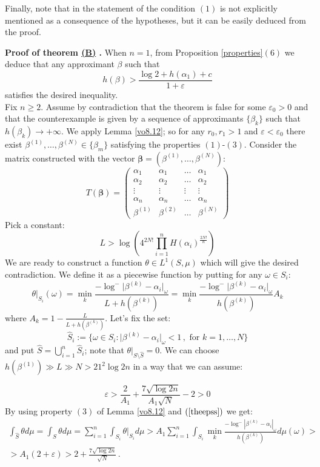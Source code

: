 \documentclass[10 pt,a4paper]{article}
\theoremstyle{plain}
\theoremstyle{definition}
\theoremstyle{named}
\newcommand\bref[3][blue]{%
    \begingroup%
    \hypersetup{linkcolor=#1}%
    \hyperlink{#2}{#3}%
    \endgroup}
\begin{document}
Finally,  note that in the statement of \cite[Proposition 8.12]{vo} the condition $(1)$ is not explicitly mentioned as a consequence of the hypotheses, but it can be easily deduced from the proof.
\endproof




\textbf{Proof of theorem \bref{thm:main}{(B)}.}
When $n=1$, from  Proposition \ref{properties}$(6)$ we deduce that  any approximant $\beta$ such that 
$$h(\beta)>\frac{\log 2+h(\alpha_1)+c}{1+\varepsilon}
$$
satisfies the desired inequality.\\
 

 Fix $n\ge 2$. Assume by contradiction that the theorem is false for some  $\varepsilon_0>0$ and that the counterexample is given by a sequence of approximants $\{\beta_k\}$ such that $h(\beta_k)\to+\infty$.  We apply Lemma \ref{vo8.12}; so for any  $r_0,r_1>1$ and $\varepsilon<\varepsilon_0$  there exist $\beta^{(1)},\ldots,\beta^{(N)}\in\{\beta_m\}$ satisfying the properties $(1)$-$(3)$. Consider the matrix constructed with the vector $\bm{\beta}=(\beta^{(1)},\ldots,\beta^{(N)})$:
\[
T(\bm{\beta})=\begin{pmatrix}
 \alpha_1& \alpha_1  &\ldots &\alpha_1 \\
 \alpha_2& \alpha_2  &\ldots &\alpha_2\\
\vdots & \vdots  & \vdots & \vdots\\
\alpha_n& \alpha_n  &\ldots &\alpha_n\\
\beta^{(1)}& \beta^{(2)}  &\ldots &\beta^{(N)}
\end{pmatrix}
\] 
 Pick a constant:
\[
L>  \log\left(4^{2N!}\prod^n_{i=1}H(\alpha_i)^{\frac{2N!}{n}}\right) 
\]
 We are ready to construct a function  $\theta\in L^1(S,\mu)$ which will give the desired contradiction. We define it as a piecewise function by putting for any $\omega\in S_i$:
\[
\theta|_{S_i}(\omega)=\min_k\frac{-\log^- \vert \beta^{(k)}-\alpha_i\vert_{\omega}}{L+h(\beta^{(k)})}= \min_k \frac{-\log^- \vert \beta^{(k)}-\alpha_i\vert_{\omega}}{h(\beta^{(k)})}A_k
\]
where $A_k=1-\frac{L}{L+h(\beta^{(k)})}$. Let's fix the set:
\[
\hat S_i:=\{\omega\in S_i\colon \vert\beta^{(k)}-\alpha_i\vert_\omega < 1\,, \text{ for } k=1,\ldots, N\}
\]
 and put $\hat S=\bigcup^n_{i=1} \hat S_i$; note that $\theta|_{S\setminus\hat S}=0$.  We can choose  $h(\beta^{(1)})\gg L\gg N> 21^2\log 2n $ in a way that we can assume: 

\begin{equation}\label{theepss}
\varepsilon>\frac{2}{A_1}+\frac{7\sqrt{\log 2n}}{A_1\sqrt N}-2>0
\end{equation}
By using property $(3)$ of Lemma \ref{vo8.12} and  $(\ref{theepss})$ we get:
\begin{eqnarray}\label{final_contr1}
\int_{\hat S}\theta d\mu =\int_{ S} \theta d\mu=\sum^n_{i=1}\int_{S_i}\theta|_{S_i}d\mu>A_1\sum_{i=1}^n\int_{S_i}\min_{k}\frac{-\log^-|\beta^{(k)}-\alpha_i|_\omega}{h(\beta^{(k)})}d\mu(\omega)> \nonumber \\
>A_1\left(2+\varepsilon\right)>2+\frac{7\sqrt{\log 2n}}{\sqrt N}\,.
\end{eqnarray}
\end{document}
